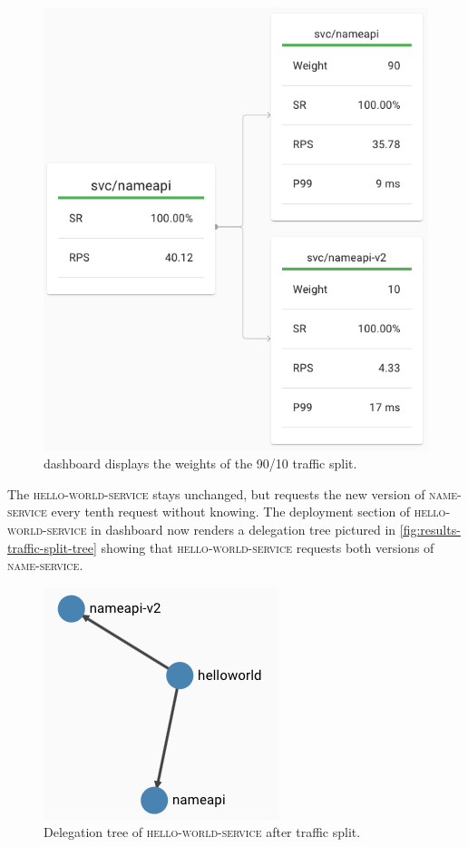 \begin{figure}
	\includegraphics[width=\columnwidth]{img/results-traffic-split-weights}
	\caption{\linkerd{} dashboard displays the weights of the 90/10 traffic split.}
	\label{fig:results-traffic-split-weights}
\end{figure}

The \textsc{hello-world-service} stays unchanged, but requests the new version of \textsc{name-service} every tenth request without knowing.
The deployment section of \textsc{hello-world-service} in \linkerd{} dashboard now renders a delegation tree pictured in \autoref{fig:results-traffic-split-tree} showing that \textsc{hello-world-service} requests both versions of \textsc{name-service}.

\begin{figure}
	\includegraphics[width=.4\columnwidth]{img/results-traffic-split-tree}
	\centering
	\caption{Delegation tree of \textsc{hello-world-service} after traffic split.}
	\label{fig:results-traffic-split-tree}
\end{figure}




